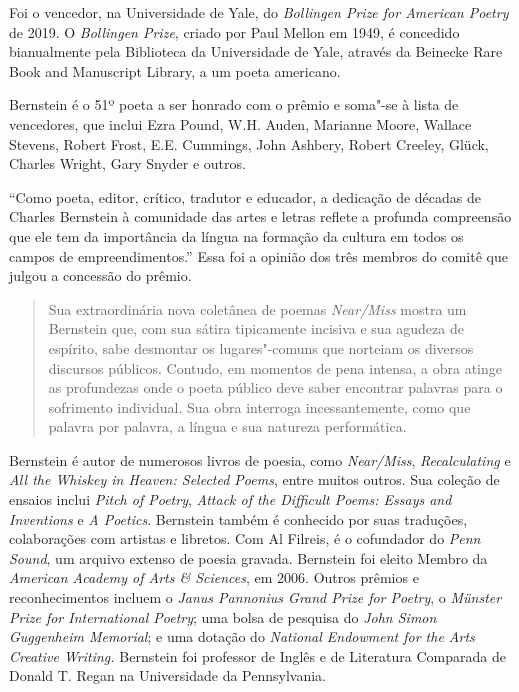 Foi o vencedor, na Universidade de Yale, do
\emph{Bollingen Prize for
American Poetry} de 2019. O \emph{Bollingen Prize}, criado por Paul
Mellon em 1949, é concedido bianualmente pela Biblioteca da Universidade
de Yale, através da Beinecke Rare Book and Manuscript Library, a um
poeta americano.

Bernstein é o 51º poeta a ser honrado com o prêmio e
soma"-se à lista de vencedores, que inclui Ezra Pound, W.H. Auden,
Marianne Moore, Wallace Stevens, Robert Frost, E.E. Cummings, John
Ashbery, Robert Creeley, Glück, Charles Wright, Gary Snyder e outros.

``Como poeta, editor, crítico, tradutor e educador, a dedicação de
décadas de Charles Bernstein à comunidade das artes e letras reflete a
profunda compreensão que ele tem da importância da língua na formação da
cultura em todos os campos de empreendimentos.'' Essa foi a opinião dos
três membros do comitê que julgou a concessão do prêmio.

\begin{quote}
Sua extraordinária nova coletânea de poemas \emph{Near/Miss} mostra um
Bernstein que, com sua sátira tipicamente incisiva e sua agudeza de
espírito, sabe desmontar os lugares"-comuns que norteiam os diversos
discursos públicos. Contudo, em momentos de pena intensa, a obra atinge
as profundezas onde o poeta público deve saber encontrar palavras para o
sofrimento individual. Sua obra interroga incessantemente, como que
palavra por palavra, a língua e sua natureza performática.
\end{quote}

Bernstein é autor de numerosos livros de poesia, como \emph{Near/Miss},
\emph{Recalculating} e \emph{All the Whiskey in Heaven: Selected Poems},
entre muitos outros. Sua coleção de ensaios inclui \emph{Pitch of
Poetry}, \emph{Attack of the Difficult Poems: Essays and Inventions} e
\emph{A Poetics}. Bernstein também é conhecido por suas traduções,
colaborações com artistas e libretos. Com Al Filreis, é o cofundador do
\emph{Penn Sound}, um arquivo extenso de poesia gravada. Bernstein foi
eleito Membro da \emph{American Academy of Arts \& Sciences}, em 2006.
Outros prêmios e reconhecimentos incluem o \emph{Janus Pannonius Grand
Prize for Poetry}, o \emph{Münster Prize for International Poetry}; uma
bolsa de pesquisa do \emph{John Simon} \emph{Guggenheim Memorial}; e uma
dotação do \emph{National Endowment for the Arts Creative
Writing.} Bernstein foi professor de Inglês e de Literatura Comparada de
Donald T. Regan na Universidade da Pennsylvania.

